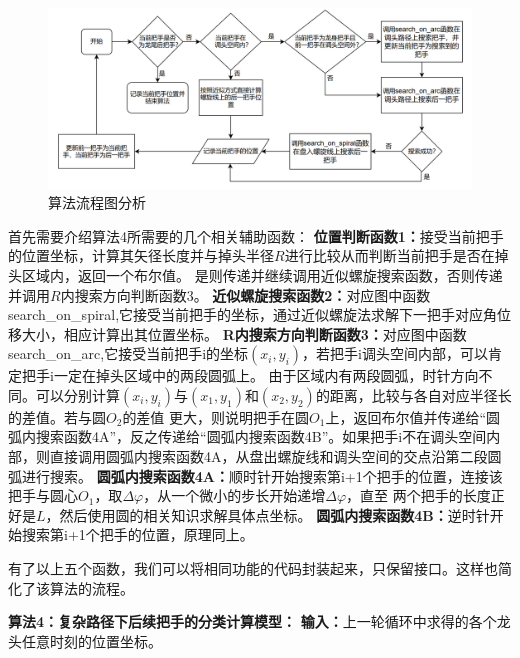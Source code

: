 \documentclass{cumcmthesis1}
\begin{document}
\begin{figure}[h]
    \caption{算法流程图分析}
    \centering    
    \includegraphics[width=0.97\linewidth]{drawing_5.4.4.1.png}
\end{figure}
\par
首先需要介绍算法4所需要的几个相关辅助函数：
\newline
\noindent
\textbf{位置判断函数1：}接受当前把手的位置坐标，计算其矢径长度并与掉头半径$R$进行比较从而判断当前把手是否在掉头区域内，返回一个布尔值。
是则传递并继续调用近似螺旋搜索函数，否则传递并调用$R$内搜索方向判断函数3。
\newline
\noindent
\textbf{近似螺旋搜索函数2：}对应图中函数search\_on\_spiral,它接受当前把手的坐标，通过近似螺旋法求解下一把手对应角位移大小，相应计算出其位置坐标。
\newline
\noindent
\textbf{R内搜索方向判断函数3：}对应图中函数search\_on\_arc,它接受当前把手i的坐标$(x_i,y_i)$，若把手i调头空间内部，可以肯定把手i一定在掉头区域中的两段圆弧上。
由于区域内有两段圆弧，时针方向不同。可以分别计算$(x_i,y_i)$与$(x_1,y_1)$和$(x_2,y_2)$的距离，比较与各自对应半径长的差值。若与圆$O_2$的差值
更大，则说明把手在圆$O_1$上，返回布尔值并传递给“圆弧内搜索函数4A”，反之传递给“圆弧内搜索函数4B”。如果把手i不在调头空间内部，则直接调用圆弧内搜索函数4A，从盘出螺旋线和调头空间的交点沿第二段圆弧进行搜索。
\newline
\noindent
\textbf{圆弧内搜索函数4A：}顺时针开始搜索第i+1个把手的位置，连接该把手与圆心$O_1$，取$\Delta \varphi $，从一个微小的步长开始递增$\Delta \varphi $，直至
两个把手的长度正好是$L$，然后使用圆的相关知识求解具体点坐标。
\newline
\noindent
\textbf{圆弧内搜索函数4B：}逆时针开始搜索第i+1个把手的位置，原理同上。
\par
有了以上五个函数，我们可以将相同功能的代码封装起来，只保留接口。这样也简化了该算法的流程。
\par
\textbf{算法4：复杂路径下后续把手的分类计算模型：}
\newline
\noindent
\textbf{输入：}上一轮循环中求得的各个龙头任意时刻的位置坐标。
\end{document}
